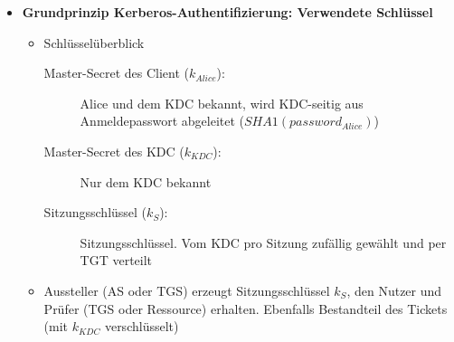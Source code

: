 \begin{itemize}
\begin{enumerate}
	\end{enumerate}
	\item \textbf{Grundprinzip Kerberos-Authentifizierung: Verwendete Schlüssel}
	\begin{itemize}
		\item Schlüsselüberblick
		\begin{description}
			\item[Master-Secret des Client (\(k_{Alice}\)):] Alice und dem KDC bekannt, wird KDC-seitig aus Anmeldepasswort abgeleitet (\(SHA1(password_{Alice})\))
			\item[Master-Secret des KDC (\(k_{KDC}\)):] Nur dem KDC bekannt
			\item[Sitzungsschlüssel (\(k_S\)):] Sitzungsschlüssel. Vom KDC pro Sitzung zufällig gewählt und per TGT verteilt
		\end{description}
		\item Aussteller (AS oder TGS) erzeugt Sitzungsschlüssel \(k_S\), den Nutzer und Prüfer (TGS oder Ressource) erhalten. Ebenfalls Bestandteil des Tickets (mit \(k_{KDC}\) verschlüsselt)
	\end{itemize}
\end{itemize}


